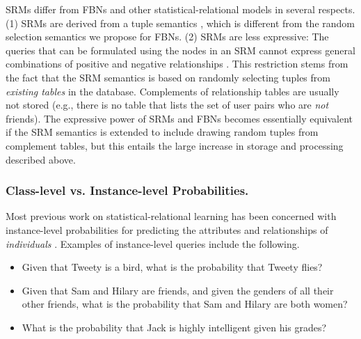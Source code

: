 \documentclass[oribibl]{llncs}
\begin{document}
SRMs differ from FBNs and other statistical-relational models in several respects. (1) SRMs are derived from a tuple semantics \cite[Def.6.3]{Getoor2001a}, which is different from the random selection semantics we propose for FBNs.
(2) SRMs are less expressive: The queries that can be formulated  using the nodes in an SRM cannot express general combinations of positive and negative relationships \cite[Def.6.6]{Getoor2001a}. This restriction stems from the fact that the SRM semantics is based on randomly selecting tuples from {\em existing tables} in the database. Complements of relationship tables are usually not stored (e.g., there is no table that lists the set of user pairs who are {\em not} friends). The expressive power of SRMs and FBNs becomes essentially equivalent if the SRM semantics is extended to include drawing random tuples from complement tables, but this
entails the large increase in storage and processing described above.

\subsubsection{Class-level vs. Instance-level Probabilities.}
Most previous work on stat\-istical-relational learning has been concerned with instance-level probabilities for predicting the attributes and relationships of {\em individuals} \cite{getoor-intro,Russell2010}. Examples of instance-level queries include the following.

\begin{itemize}
\item Given that Tweety is a bird, what is the probability that Tweety flies?
\item Given that Sam and Hilary are friends, and given the genders of all their other friends, what is the probability that Sam and Hilary are both women?
\item What is the probability that Jack is highly intelligent given his grades?
\end{itemize}
\end{document}

